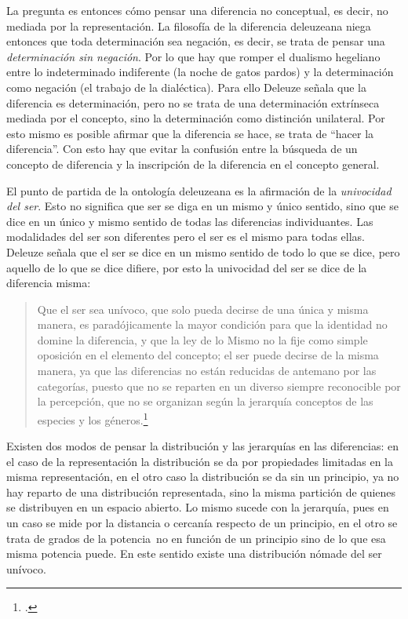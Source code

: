 La pregunta es entonces cómo pensar una diferencia no conceptual, es decir, no mediada por la representación. La filosofía de la diferencia deleuzeana niega entonces que toda determinación sea negación, es decir, se trata de pensar una \emph{determinación sin negación}. Por lo que hay que romper el dualismo hegeliano entre lo indeterminado indiferente (la noche de gatos pardos) y la determinación como negación (el trabajo de la dialéctica). Para ello Deleuze señala que la diferencia es determinación, pero no se trata de una determinación extrínseca mediada por el concepto, sino la determinación como distinción unilateral. Por esto mismo es posible afirmar que la diferencia se hace, se trata de \enquote{hacer la diferencia}. Con esto hay que evitar la confusión entre la búsqueda de un concepto de diferencia y la inscripción de la diferencia en el concepto general.

El punto de partida de la ontología deleuzeana es la afirmación de la \emph{univocidad del ser}. Esto no significa que ser se diga en un mismo y único sentido, sino que se dice en un único y mismo sentido de todas las diferencias individuantes. Las modalidades del ser son diferentes pero el ser es el mismo para todas ellas. Deleuze señala que el ser se dice en un mismo sentido de todo lo que se dice, pero aquello de lo que se dice difiere, por esto la univocidad del ser se dice de la diferencia misma:

\begin{quote}
Que el ser sea unívoco, que solo pueda decirse de una única y misma manera, es paradójicamente la mayor condición para que la identidad no domine la diferencia, y que la ley de lo Mismo no la fije como simple oposición en el elemento del concepto; el ser puede decirse de la misma manera, ya que las diferencias no están reducidas de antemano por las categorías, puesto que no se reparten en un diverso siempre reconocible por la percepción, que no se organizan según la jerarquía conceptos de las especies y los géneros.\footcite[42]{@6978-FOUCAULT1995}
\end{quote}

Existen dos modos de pensar la distribución y las jerarquías en las diferencias: en el caso de la representación la distribución se da por propiedades limitadas en la misma representación, en el otro caso la distribución se da sin un principio, ya no hay reparto de una distribución representada, sino la misma partición de quienes se distribuyen en un espacio abierto. Lo mismo sucede con la jerarquía, pues en un caso se mide por la distancia o cercanía respecto de un principio, en el otro se trata de grados de la potencia~no en función de un principio sino de lo que esa misma potencia puede. En este sentido existe una distribución nómade del ser unívoco.

